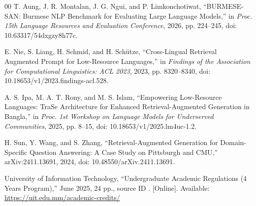 \documentclass[a4paper,conference]{IEEEtran}
\newcommand{\code}[1]{\texttt{\detokenize{#1}}}
\begin{document}
\begin{thebibliography}{00}
T. Aung, J. R. Montalan, J. G. Ngui, and P. Limkonchotiwat, ``BURMESE-SAN: Burmese NLP Benchmark for Evaluating Large Language Models,'' in \emph{Proc. 15th Language Resources and Evaluation Conference}, 2026, pp. 224--245, doi: 10.63317/54dxgzy8h77c.

E. Nie, S. Liang, H. Schmid, and H. Sch\"utze, ``Cross-Lingual Retrieval Augmented Prompt for Low-Resource Languages,'' in \emph{Findings of the Association for Computational Linguistics: ACL 2023}, 2023, pp. 8320--8340, doi: 10.18653/v1/2023.findings-acl.528.

A. S. Ipa, M. A. T. Rony, and M. S. Islam, ``Empowering Low-Resource Languages: TraSe Architecture for Enhanced Retrieval-Augmented Generation in Bangla,'' in \emph{Proc. 1st Workshop on Language Models for Underserved Communities}, 2025, pp. 8--15, doi: 10.18653/v1/2025.lm4uc-1.2.

H. Sun, Y. Wang, and S. Zhang, ``Retrieval-Augmented Generation for Domain-Specific Question Answering: A Case Study on Pittsburgh and CMU,'' arXiv:2411.13691, 2024, doi: 10.48550/arXiv.2411.13691.

University of Information Technology, ``Undergraduate Academic Regulations (4 Years Program),'' June 2025, 24 pp., source ID \code{UIT-SRC-025}. [Online]. Available: \url{https://uit.edu.mm/academic-credits/}
\end{thebibliography}
\end{document}

